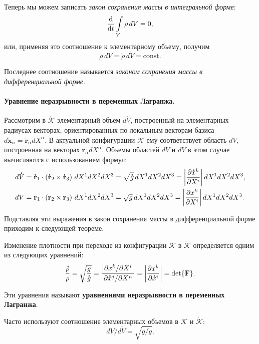 Теперь мы можем записать \textit{закон сохранения массы в интегральной форме}: 
\begin{equation*}
	\dv{}{t} \int\limits_{V} \rho \, dV = 0,
\end{equation*}
или, применяя это соотношение к элементарному объему, получим
\begin{equation*}
	\rho \, dV = \mathring{\rho} \, d\mathring{V} = \mathrm{const}.
\end{equation*}

Последнее соотношение называется \textit{законом сохранения массы в дифференциальной форме}. 

\paragraph{Уравнение неразрывности в переменных Лагранжа.} Рассмотрим в $\mathring{\mathcal{K}}$ элементарный объем $d\mathring{V}$, построенный на элементарных радиусах векторах, ориентированных по локальным векторам базиса $d\mathring{\mathbf{x}}_{\alpha} = \mathring{\mathbf{r}}_{\alpha} d X^{\alpha}$. В актуальной конфигурации $\mathcal{K}$ ему соответствует область $dV$, построенная на векторах $\mathbf{r}_{\alpha} dX^{\alpha}$. Объемы областей $d\mathring{V}$ и $dV$ в этом случае вычисляются с использованием формул:
\begin{align*}
	d\mathring{V} &= \mathring{\mathbf{r}}_1 \cdot \left(\mathring{\mathbf{r}}_2 \times \mathring{\mathbf{r}}_3\right) \, dX^1 dX^2 dX^3 = \sqrt{\mathring{g}} \, dX^1 dX^2 dX^3 = \abs{\frac{\partial \mathring{x}^k}{\partial X^i}} \, dX^1 dX^2 dX^3, \\
	dV &= \mathbf{r}_1 \cdot \left(\mathbf{r}_2 \times \mathbf{r}_3\right) \, dX^1 dX^2 dX^3 = \sqrt{g} \, dX^1 dX^2 dX^3 = \abs{\frac{\partial x^k}{\partial X^i}} \, dX^1 dX^2 dX^3.
\end{align*}

Подставляя эти выражения в закон сохранения массы в дифференциальной форме приходим к следующей теореме.

\begin{theorem*}
	Изменение плотности при переходе из конфигурации $\mathcal{K}$ в $\mathring{\mathcal{K}}$ определяется одним из следующих уравнений:
	\begin{equation*}
		\frac{\mathring{\rho}}{\rho} = \sqrt{\frac{g}{\mathring{g}}} = \frac{\abs{\partial x^k / \partial X^i}}{\partial \mathring{x}^j / \partial X^n} = \abs{\frac{\partial x^k}{\partial \mathring{x}^i}} = \det{\mathbf{F}}.
	\end{equation*}
	
	Эти уравнения называют \textbf{уравнениями неразрывности в переменных Лагранжа}.
	
	Часто используют соотношение элементарных объемов в $\mathcal{K}$ и $\mathring{\mathcal{K}}$:
	\begin{equation*}
		dV / d\mathring{V} = \sqrt{g / \mathring{g}}.
	\end{equation*}
\end{theorem*}
